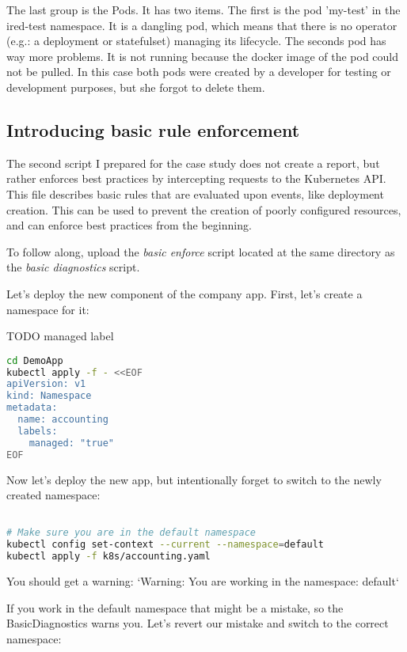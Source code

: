 The last group is the Pods. It has two items. The first is the pod 'my-test' in the ired-test namespace. It is a dangling pod, which means that there is no operator (e.g.: a deployment or statefulset) managing its lifecycle. The seconds pod has way more problems. It is not running because the docker image of the pod could not be pulled. In this case both pods were created by a developer for testing or development purposes, but she forgot to delete them.

\subsection{Introducing basic rule enforcement}

The second script I prepared for the case study does not create a report, but rather enforces best practices by intercepting requests to the Kubernetes API.
This file describes basic rules that are evaluated upon events, like deployment creation. This can be used to prevent the creation of poorly configured resources, and can enforce best practices from the beginning.

To follow along, upload the \emph{basic enforce} script located at the same directory as the \emph{basic diagnostics} script.

Let's deploy the new component of the company app. First, let's create a namespace for it:

TODO managed label

\begin{lstlisting}[caption={TODO},language=bash,label=code:bashx]
cd DemoApp
kubectl apply -f - <<EOF
apiVersion: v1
kind: Namespace
metadata:
  name: accounting
  labels:
    managed: "true"
EOF
\end{lstlisting}

Now let's deploy the new app, but intentionally forget to switch to the newly created namespace:

\begin{lstlisting}[caption={TODO},language=bash,label=code:bashx]

# Make sure you are in the default namespace
kubectl config set-context --current --namespace=default
kubectl apply -f k8s/accounting.yaml
\end{lstlisting}

You should get a warning: `Warning: You are working in the namespace: default`

If you work in the default namespace that might be a mistake, so the BasicDiagnostics warns you. Let's revert our mistake and switch to the correct namespace:

